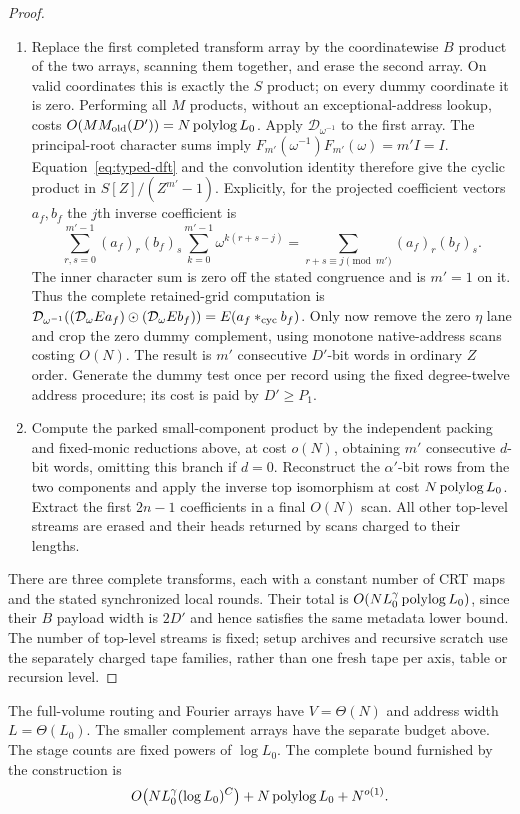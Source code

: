 \begin{proof}
\begin{enumerate}
boundaries are used in this identity. Their valid block has entries
in $S$, so a complete transform returns $S$-valued words when its
input was $S$-valued. Keep the unused $\eta$ lane allocated nonetheless.
\item Replace the first completed transform array by the coordinatewise
$B$ product of the two arrays, scanning them together, and erase the
second array. On valid coordinates this is exactly the $S$ product;
on every dummy coordinate it is zero. Performing all $M$ products,
without an exceptional-address lookup, costs
$O(MM_{\rm old}(D'))=N\operatorname{polylog} L_0$. Apply
$\mathcal D_{\omega^{-1}}$ to the first array. The principal-root
character sums imply
$F_{m'}(\omega^{-1})F_{m'}(\omega)=m'I=I$.
Equation~\eqref{eq:typed-dft} and the convolution identity therefore
give the cyclic product in $S[Z]/(Z^{m'}-1)$.
Explicitly, for the projected coefficient vectors $a_f,b_f$ the
$j$th inverse coefficient is
\[
 \sum_{r,s=0}^{m'-1}(a_f)_r(b_f)_s
       \sum_{k=0}^{m'-1}\omega^{k(r+s-j)}
   =\sum_{r+s\equiv j\pmod {m'}}(a_f)_r(b_f)_s.
\]
The inner character sum is zero off the stated congruence and is
$m'=1$ on it. Thus the complete retained-grid computation is
$\mathcal D_{\omega^{-1}}
 ((\mathcal D_\omega E a_f)\odot(\mathcal D_\omega E b_f))
 =E(a_f*_{\rm cyc} b_f)$.
Only now remove the zero $\eta$ lane and crop the zero dummy complement,
using monotone native-address scans costing $O(N)$. The result is
$m'$ consecutive $D'$-bit words in ordinary $Z$ order.
Generate the dummy test once per record using the fixed degree-twelve
address procedure; its cost is paid by $D'\ge P_1$.
\item Compute the parked small-component product by the independent
packing and fixed-monic reductions above, at cost $o(N)$, obtaining
$m'$ consecutive $d$-bit words, omitting this branch if $d=0$.
Reconstruct the $\alpha'$-bit rows from
the two components and apply the inverse top isomorphism at cost
$N\operatorname{polylog} L_0$. Extract the first $2n-1$ coefficients in a final
$O(N)$ scan. All other top-level streams are erased and their heads
returned by scans charged to their lengths.
\end{enumerate}
There are three complete transforms, each with a constant number of CRT
maps and the stated synchronized local rounds. Their total is
$O(NL_0^\gamma\operatorname{polylog} L_0)$, since their $B$ payload width is $2D'$
and hence satisfies the same metadata lower bound. The number of
top-level streams is fixed; setup archives and recursive scratch use
the separately charged tape families, rather than one fresh tape per
axis, table or recursion level.
\end{proof}

The full-volume routing and Fourier arrays have $V=\Theta(N)$ and
address width $L=\Theta(L_0)$. The smaller complement arrays have
the separate budget above. The stage counts are fixed powers of $\log L_0$.
The complete bound furnished by the construction is
\[
 O\bigl(NL_0^\gamma(\log L_0)^C\bigr)
   +N\operatorname{polylog} L_0+N^{o(1)}.
\]
